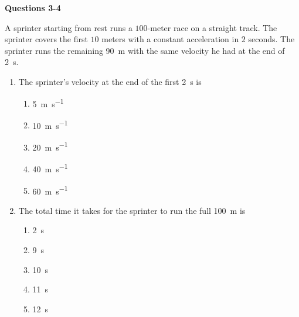 \documentclass{../../oss-apphys}
\begin{document}
\begin{multicols}{2}
  \columnbreak
  \textbf{Questions 3-4}
  
  A sprinter starting from rest runs a $100$-meter race on a straight track. The
  sprinter covers the first $10$ meters with a constant acceleration in $2$
  seconds. The sprinter runs the remaining \SI{90}{m} with the same velocity he
  had at the end of \SI{2}{s}.

  \begin{enumerate}[resume,leftmargin=18pt]
  \item The sprinter's velocity at the end of the first \SI{2}{\second} is
    \begin{enumerate}[noitemsep,topsep=0pt,leftmargin=18pt,label=(\Alph*)]
    \item\SI{5 }{\metre\per\second}
    \item\SI{10}{\metre\per\second}
    \item\SI{20}{\metre\per\second}
    \item\SI{40}{\metre\per\second}
    \item\SI{60}{\metre\per\second}
    \end{enumerate}

  \item The total time it takes for the sprinter to run the full \SI{100}{m} is
    \begin{enumerate}[noitemsep,topsep=0pt,leftmargin=18pt,label=(\Alph*)]
    \item\SI{2 }{\second}
    \item\SI{9 }{\second}
    \item\SI{10}{\second}
    \item\SI{11}{\second}
    \item\SI{12}{\second}
    \end{enumerate}
    \columnbreak
    

\end{enumerate}
\end{multicols}
\end{document}
